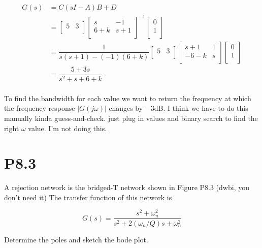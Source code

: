 \documentclass[11pt]{article}
\begin{document}
\begin{align*}
    G(s) &= C(sI - A)B + D \\
    &= \begin{bmatrix}
        5 & 3 \\
    \end{bmatrix}
    \begin{bmatrix}
        s & -1 \\
        6 + k & s + 1 \\
    \end{bmatrix}^{-1}
    \begin{bmatrix}
        0 \\
        1 \\
    \end{bmatrix} \\
    &= \dfrac{1}{s(s + 1) - (-1)(6 + k)}
    \begin{bmatrix}
        5 & 3 \\
    \end{bmatrix}
    \begin{bmatrix}
        s + 1 & 1 \\
        -6 - k & s \\
    \end{bmatrix}
    \begin{bmatrix}
        0 \\
        1 \\
    \end{bmatrix} \\
    &= \dfrac{5 + 3s}{s^2 + s + 6 + k} \\
\end{align*}

To find the bandwidth for each value we want to return the frequency at which the frequency response $|G(j\omega)|$ changes by $-3$dB. I think we have to do this manually kinda guess-and-check. just plug in values and binary search to find the right $\omega$ value. I'm not doing this.

\section{P8.3}

A rejection network is the bridged-T network shown in Figure P8.3 (dwbi, you don't need it) The transfer function of this network is

\[ G(s) = \dfrac{s^2 + \omega^2_n}{s^2 + 2 (\omega_n / Q)s + \omega^2_n} \]

Determine the poles and sketch the bode plot.
\end{document}
